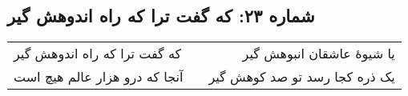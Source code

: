 \begin{center}
\section*{شماره ۲۳: که گفت ترا که راه اندوهش گیر}
\label{sec:023}
\begin{longtable}{l p{0.5cm} r}
که گفت ترا که راه اندوهش گیر
&&
یا شیوهٔ عاشقان انبوهش گیر
\\
آنجا که درو هزار عالم هیچ است
&&
یک ذره کجا رسد تو صد کوهش گیر
\\
\end{longtable}
\end{center}
